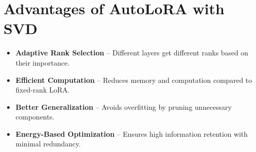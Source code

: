 \documentclass{article}
\begin{document}
\section{Advantages of AutoLoRA with SVD}
\begin{itemize}
    \item \textbf{Adaptive Rank Selection} – Different layers get different ranks based on their importance.
    \item \textbf{Efficient Computation} – Reduces memory and computation compared to fixed-rank LoRA.
    \item \textbf{Better Generalization} – Avoids overfitting by pruning unnecessary components.
    \item \textbf{Energy-Based Optimization} – Ensures high information retention with minimal redundancy.
\end{itemize}
\end{document}
